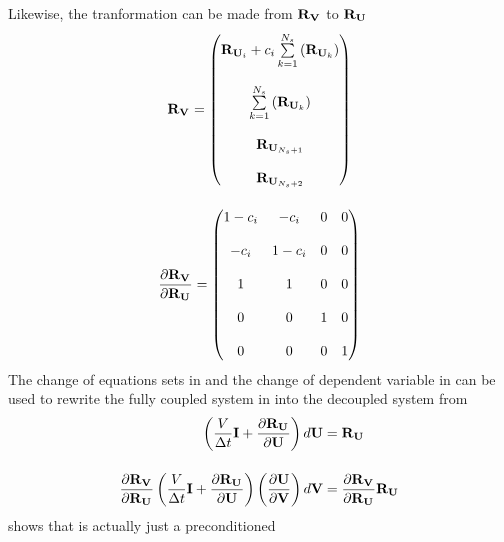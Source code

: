 Likewise, the tranformation can be made from $\mathbf R_{{\mathbf V}_{}}$ to $\mathbf R_{{\mathbf U}_{}}$
\begin{gather}
  \rv{} =
  \begin{pmatrix}
    \ru{i} + c_i \lsum{k=1}{N_s}{\left( \ru{k} \right)} \\ \\
    \lsum{k=1}{N_s}{\left( \ru{k} \right)} \\ \\
    \ru{N_s+1} \\ \\
    \ru{N_s+2}
  \end{pmatrix}
  \label{rv-to-ru} \\[12pt]
  \pd{\rv{}}{\ru{}} =
  \begin{pmatrix}
    1 - c_i & -c_i    & 0 & 0 \\ \\
    -c_i    & 1 - c_i & 0 & 0 \\ \\
    1       & 1       & 0 & 0 \\ \\
    0       & 0       & 1 & 0 \\ \\
    0       & 0       & 0 & 1
  \end{pmatrix}
  \label{drvdru}
\end{gather}
The change of equations sets in  and the change of
dependent variable in  can be used to rewrite the fully coupled
system in  into the decoupled system from 
\begin{equation}
  \begin{aligned}
    \left( \frac{V}{\Delta t} \mi + \pd{\ru{}}{\mU} \right) d \mU &= \ru{}
    \\[12pt]
    \pd{\rv{}}{\ru{}}
    \left( \frac{V}{\Delta t} \mi + \pd{\ru{}}{\mU} \right)
    \left( \pd{\mU}{\mv} \right) d \mv
    &= 
    \pd{\rv{}}{\ru{}} \ru{}
  \end{aligned}
  \label{fc-to-dc-form}
\end{equation}
 shows that  is actually just a preconditioned
